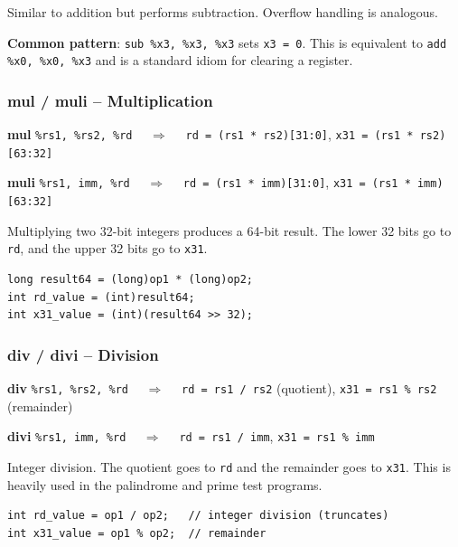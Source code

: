 \documentclass[12pt,a4paper]{article}
\begin{document}
Similar to addition but performs subtraction. Overflow handling is analogous.

\textbf{Common pattern}: \texttt{sub \%x3, \%x3, \%x3} sets \texttt{x3 = 0}. This is equivalent to \texttt{add \%x0, \%x0, \%x3} and is a standard idiom for clearing a register.

\subsubsection{mul / muli -- Multiplication}

\begin{tcolorbox}[colback=blue!5, colframe=blue!50!black]
\textbf{mul} \texttt{\%rs1, \%rs2, \%rd} $\quad\Rightarrow\quad$ \texttt{rd = (rs1 * rs2)[31:0]}, \texttt{x31 = (rs1 * rs2)[63:32]}

\textbf{muli} \texttt{\%rs1, imm, \%rd} $\quad\Rightarrow\quad$ \texttt{rd = (rs1 * imm)[31:0]}, \texttt{x31 = (rs1 * imm)[63:32]}
\end{tcolorbox}

Multiplying two 32-bit integers produces a 64-bit result. The lower 32 bits go to \texttt{rd}, and the upper 32 bits go to \texttt{x31}.

\begin{lstlisting}[style=javastyle]
long result64 = (long)op1 * (long)op2;
int rd_value = (int)result64;
int x31_value = (int)(result64 >> 32);
\end{lstlisting}

\subsubsection{div / divi -- Division}

\begin{tcolorbox}[colback=blue!5, colframe=blue!50!black]
\textbf{div} \texttt{\%rs1, \%rs2, \%rd} $\quad\Rightarrow\quad$ \texttt{rd = rs1 / rs2} (quotient), \texttt{x31 = rs1 \% rs2} (remainder)

\textbf{divi} \texttt{\%rs1, imm, \%rd} $\quad\Rightarrow\quad$ \texttt{rd = rs1 / imm}, \texttt{x31 = rs1 \% imm}
\end{tcolorbox}

Integer division. The quotient goes to \texttt{rd} and the remainder goes to \texttt{x31}. This is heavily used in the palindrome and prime test programs.

\begin{lstlisting}[style=javastyle]
int rd_value = op1 / op2;   // integer division (truncates)
int x31_value = op1 % op2;  // remainder
\end{lstlisting}
\end{document}
